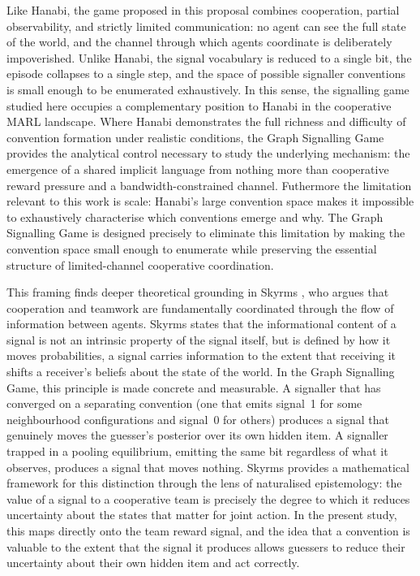 \documentclass[a4paper,twoside,12pt]{report}
\begin{document}
    \newline
    \newline
    Like Hanabi, the game proposed in this proposal combines cooperation, partial observability, and strictly limited communication: no agent can see the full state of the world, and the channel through which agents coordinate is deliberately impoverished. Unlike Hanabi, the signal vocabulary is reduced to a single bit, the episode collapses to a single step, and the space of possible signaller conventions is small enough to be enumerated exhaustively. In this sense, the signalling game studied here occupies a complementary position to Hanabi in the cooperative MARL landscape. Where Hanabi demonstrates the full richness and difficulty of convention formation under realistic conditions, the Graph Signalling Game provides the analytical control necessary to study the underlying mechanism: the emergence of a shared implicit language from nothing more than cooperative reward pressure and a bandwidth-constrained channel. Futhermore the limitation relevant to this work is scale: Hanabi's large convention space makes it impossible to exhaustively characterise which conventions emerge and why. The Graph Signalling Game is designed precisely to eliminate this limitation by making the convention space small enough to enumerate while preserving the essential structure of limited-channel cooperative coordination.
    \newline
    
    This framing finds deeper theoretical grounding in Skyrms \citeyearpar{skyrms2010}, who argues that cooperation and teamwork are fundamentally coordinated through the flow of information between agents. Skyrms states that the informational content of a signal is not an intrinsic property of the signal itself, but is defined by how it moves probabilities, a signal carries information to the extent that receiving it shifts a receiver's beliefs about the state of the world. In the Graph Signalling Game, this principle is made concrete and measurable. A signaller that has converged on a separating convention (one that emits signal~1 for some neighbourhood configurations and signal~0 for others) produces a signal that genuinely moves the guesser's posterior over its own hidden item. A signaller trapped in a pooling equilibrium, emitting the same bit regardless of what it observes, produces a signal that moves nothing. Skyrms provides a mathematical framework for this distinction through the lens of naturalised epistemology: the value of a signal to a cooperative team is precisely the degree to which it reduces uncertainty about the states that matter for joint action. In the present study, this maps directly onto the team reward signal, and the idea that a convention is valuable to the extent that the signal it produces allows guessers to reduce their uncertainty about their own hidden item and act correctly.
    \newline
    
\end{document}
